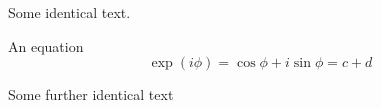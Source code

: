 Some identical text.

An equation
\begin{displaymath}
\exp(i\phi)=\cos \phi + i \sin \phi = c + d
\end{displaymath}

Some further identical text
